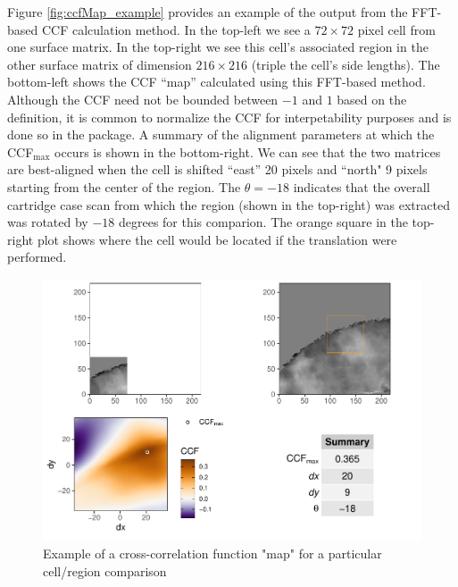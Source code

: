 Figure \ref{fig:ccfMap_example} provides an example of the output from
the FFT-based CCF calculation method. In the top-left we see a
\(72 \times 72\) pixel cell from one surface matrix. In the top-right we
see this cell's associated region in the other surface matrix of
dimension \(216 \times 216\) (triple the cell's side lengths). The
bottom-left shows the CCF ``map'' calculated using this FFT-based
method. Although the CCF need not be bounded between \(-1\) and \(1\)
based on the definition, it is common to normalize the CCF for
interpetability purposes and is done so in the  package. A
summary of the alignment parameters at which the CCF\(_{\max}\) occurs
is shown in the bottom-right. We can see that the two matrices are
best-aligned when the cell is shifted ``east'' 20 pixels and ``north" 9
pixels starting from the center of the region. The \(\theta = -18\)
indicates that the overall cartridge case scan from which the region
(shown in the top-right) was extracted was rotated by \(-18\) degrees
for this comparion. The orange square in the top-right plot shows where
the cell would be located if the translation were performed.

\begin{Schunk}
\begin{figure}[htbp]

{\centering \includegraphics[width=\linewidth]{cmcR_files/figure-latex/unnamed-chunk-2-1} 

}

\caption{\label{fig:ccfMap_example} Example of a cross-correlation function "map" for a particular cell/region comparison}\label{fig:unnamed-chunk-2}
\end{figure}
\end{Schunk}

